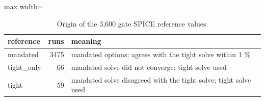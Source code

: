 \begin{table}[H]
\centering
{\small
\begin{adjustbox}{max width=\linewidth}
\begin{tabular}{lrl}
\toprule
reference & runs & meaning \\
\midrule
mandated & 3475 & mandated options; agrees with the tight solve within 1 \% \\
tight\_only & 66 & mandated solve did not converge; tight solve used \\
tight & 59 & mandated solve disagreed with the tight solve; tight solve used \\
\bottomrule
\end{tabular}
\end{adjustbox}
}
\caption{Origin of the 3{,}600 gate SPICE reference values.}
\label{tab:ref}
\end{table}

